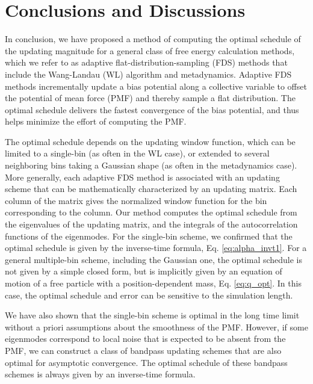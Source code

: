 \documentclass[reprint, superscriptaddress, floatfix]{revtex4-1}
\begin{document}
\section{\label{sec:conclusion}
Conclusions and Discussions}



In conclusion,
we have proposed a method of computing
the optimal schedule of the updating magnitude
for a general class of free energy calculation methods,
which we refer to as adaptive flat-distribution-sampling (FDS) methods
that include the Wang-Landau (WL) algorithm and metadynamics.
%
Adaptive FDS methods
incrementally update a bias potential
along a collective variable
to offset the potential of mean force (PMF)
and thereby sample a flat distribution.
%
The optimal schedule delivers the fastest convergence
of the bias potential,
and thus helps minimize the effort
of computing the PMF.


The optimal schedule depends on the updating window function,
which can be limited to a single-bin (as often in the WL case),
or extended to several neighboring bins
taking a Gaussian shape (as often in the metadynamics case).
%
More generally,
each adaptive FDS method is associated with
an updating scheme
that can be mathematically characterized
by an updating matrix.
%
Each column of the matrix gives the normalized
window function for the bin corresponding to the column.
%
Our method computes the optimal schedule from
the eigenvalues of the updating matrix,
and the integrals of the autocorrelation functions
of the eigenmodes.
%
For the single-bin scheme,
we confirmed that the optimal schedule
is given by the inverse-time formula,
Eq. \eqref{eq:alpha_invt1}.
%
For a general multiple-bin scheme,
including the Gaussian one,
the optimal schedule is not given by a simple closed form,
but is implicitly given by an equation of motion
of a free particle with a position-dependent mass, Eq. \eqref{eq:q_opt}.
%
In this case,
the optimal schedule and error
can be sensitive to the simulation length.
%

We have also shown that
the single-bin scheme is optimal
in the long time limit
without a priori assumptions
about the smoothness of the PMF.
%
However, if some eigenmodes
correspond to local noise
that is expected to be absent from the PMF,
we can construct a
class of bandpass updating schemes
that are also optimal for asymptotic convergence.
%
The optimal schedule of these bandpass schemes
is always given by an inverse-time formula.
\end{document}
